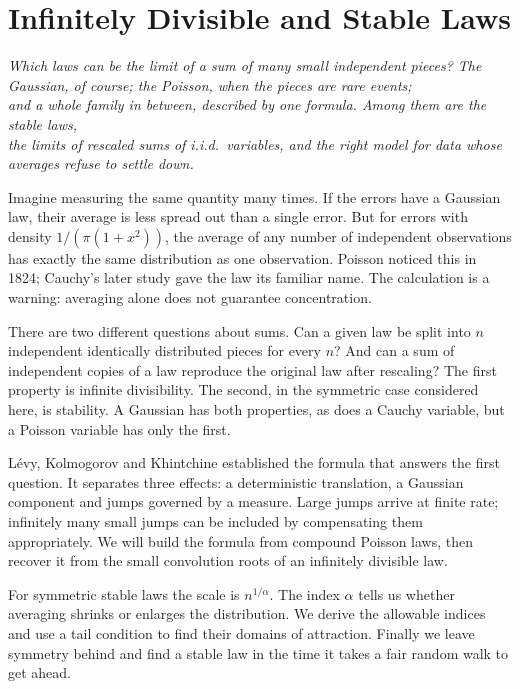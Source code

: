\chapter{Infinitely Divisible and Stable Laws}
\begin{center}\itshape
Which laws can be the limit of a sum of many small independent pieces? The Gaussian, of course; the Poisson, when the pieces are rare events;\\
and a whole family in between, described by one formula. Among them are the stable laws,\\
the limits of rescaled sums of i.i.d.\ variables, and the right model for data whose averages refuse to settle down.
\end{center}

Imagine measuring the same quantity many times. If the errors have a Gaussian law, their average is less spread out than a single error. But for errors with density $1/(\pi(1+x^2))$, the average of any number of independent observations has exactly the same distribution as one observation. Poisson noticed this in 1824; Cauchy's later study gave the law its familiar name. The calculation is a warning: averaging alone does not guarantee concentration.

There are two different questions about sums. Can a given law be split into $n$ independent identically distributed pieces for every $n$? And can a sum of independent copies of a law reproduce the original law after rescaling? The first property is infinite divisibility. The second, in the symmetric case considered here, is stability. A Gaussian has both properties, as does a Cauchy variable, but a Poisson variable has only the first.

L\'evy, Kolmogorov and Khintchine established the formula that answers the first question. It separates three effects: a deterministic translation, a Gaussian component and jumps governed by a measure. Large jumps arrive at finite rate; infinitely many small jumps can be included by compensating them appropriately. We will build the formula from compound Poisson laws, then recover it from the small convolution roots of an infinitely divisible law.

For symmetric stable laws the scale is $n^{1/\alpha}$. The index $\alpha$ tells us whether averaging shrinks or enlarges the distribution. We derive the allowable indices and use a tail condition to find their domains of attraction. Finally we leave symmetry behind and find a stable law in the time it takes a fair random walk to get ahead.

